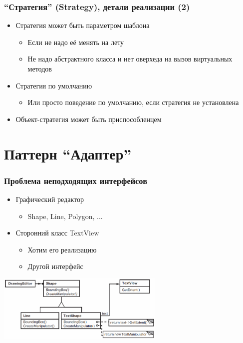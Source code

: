 \documentclass{../cscslides}
\begin{document}
    \begin{frame}
        \frametitle{``Стратегия'' (Strategy), детали реализации (2)}
        \begin{itemize}
            \item Стратегия может быть параметром шаблона
            \begin{itemize}
                \item Если не надо её менять на лету
                \item Не надо абстрактного класса и нет оверхеда на вызов виртуальных методов
            \end{itemize}
            \item Стратегия по умолчанию
            \begin{itemize}
                \item Или просто поведение по умолчанию, если стратегия не установлена
            \end{itemize}
            \item Объект-стратегия может быть приспособленцем
        \end{itemize}
    \end{frame}

    \section{Паттерн ``Адаптер''}

    \begin{frame}
        \frametitle{Проблема неподходящих интерфейсов}
        \begin{itemize}
            \item Графический редактор
            \begin{itemize}
                \item Shape, Line, Polygon, ...
            \end{itemize}
            \item Сторонний класс TextView
            \begin{itemize}
                \item Хотим его реализацию
                \item Другой интерфейс
            \end{itemize}
        \end{itemize}
        \vspace{2mm}
        \begin{center}
            \includegraphics[width=0.6\textwidth]{adapterExample.png}
        \end{center}
    \end{frame}
\end{document}
